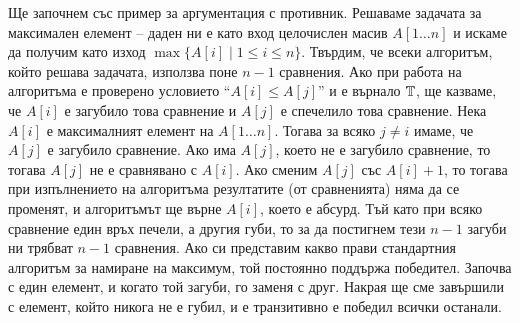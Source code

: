 Ще започнем със пример за аргументация с противник.
Решаваме задачата за максимален елемент -- даден ни е като вход целочислен масив $A[1 \dots n]$ и искаме да получим като изход $\max \{ A[i] \mid 1 \leq i \leq n \}$.
Твърдим, че всеки алгоритъм, който решава задачата, използва поне $n - 1$ сравнения.
Ако при работа на алгоритъма е проверено условието ``$A[i] \leq A[j]$'' и е върнало $\mathbb{T}$, ще казваме, че $A[i]$ е загубило това сравнение и $A[j]$ е спечелило това сравнение.
Нека $A[i]$ е максималният елемент на $A[1 \dots n]$.
Тогава за всяко $j \neq i$ имаме, че $A[j]$ е загубило сравнение.
Ако има $A[j]$, което не е загубило сравнение, то тогава $A[j]$ не е сравнявано с $A[i]$.
Ако сменим $A[j]$ със $A[i] + 1$, то тогава при изпълнението на алгоритъма резултатите (от сравненията) няма да се променят, и алгоритъмът ще върне $A[i]$, което е абсурд.
Тъй като при всяко сравнение един връх печели, а другия губи, то за да постигнем тези $n - 1$ загуби ни трябват $n - 1$ сравнения.
Ако си представим какво прави стандартния алгоритъм за намиране на максимум, той постоянно поддържа победител.
Започва с един елемент, и когато той загуби, го заменя с друг.
Накрая ще сме завършили с елемент, който никога не е губил, и е транзитивно е победил всички останали.

